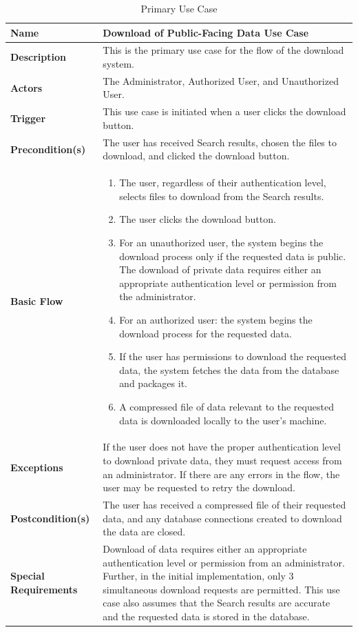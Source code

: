 \documentclass{article}
\begin{document}
\begin{table}[H]
	\caption{Primary Use Case}
	\begin{tabularx}{\textwidth}{|l|X|}
		\hline
		\textbf{Name} & Download of Public-Facing Data Use Case \\ \hline
		\textbf{Description}      & This is the primary use case for the flow of the download system.  \\ \hline
		\textbf{Actors}  & The Administrator, Authorized User, and Unauthorized User.  \\ \hline
		\textbf{Trigger}  & This use case is initiated when a user clicks the download button. \\ \hline
		\textbf{Precondition(s)}  & The user has received Search results, chosen the files to download, and clicked the download button.  \\ \hline
		\textbf{Basic Flow} &  
		\begin{enumerate}
				\item The user, regardless of their authentication level, selects files to download from the Search results.
				\item The user clicks the download button.
				\item For an unauthorized user, the system begins the download process only if the requested data is public. The download of private data requires either an appropriate authentication level or permission from the administrator.
				\item For an authorized user: the system begins the download process for the requested data.
				\item If the user has permissions to download the requested data, the system fetches the data from the database and packages it.
				\item A compressed file of data relevant to the requested data is downloaded locally to the user's machine. 
			\end{enumerate}           \\  \hline
		\textbf{Exceptions} & If the user does not have the proper authentication level to download private data, they must request access from an administrator. If there are any errors in the flow, the user may be requested to retry the download. \\  \hline
		\textbf{Postcondition(s)} & The user has received a compressed file of their requested data, and any database connections created to download the data are closed.  \\  \hline
		\textbf{Special Requirements} & Download of data requires either an appropriate authentication level or permission from an administrator. Further, in the initial implementation, only 3 simultaneous download requests are permitted. This use case also assumes that the Search results are accurate and the requested data is stored in the database.  \\  \hline
	\end{tabularx}
\end{table}
\end{document}
